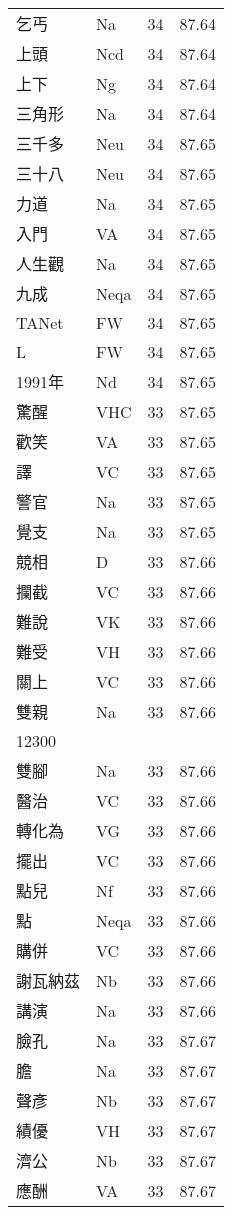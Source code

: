 \documentclass[twocolumn]{book}
\begin{document}
\begin{supertabular}{llrr}
乞丐 & Na & 34 &  87.64\\
上頭 & Ncd & 34 &  87.64\\
上下 & Ng & 34 &  87.64\\
三角形 & Na & 34 &  87.64\\
三千多 & Neu & 34 &  87.65\\
三十八 & Neu & 34 &  87.65\\
力道 & Na & 34 &  87.65\\
入門 & VA & 34 &  87.65\\
人生觀 & Na & 34 &  87.65\\
九成 & Neqa & 34 &  87.65\\
TANet & FW & 34 &  87.65\\
L & FW & 34 &  87.65\\
1991年 & Nd & 34 &  87.65\\
驚醒 & VHC & 33 &  87.65\\
歡笑 & VA & 33 &  87.65\\
譯 & VC & 33 &  87.65\\
警官 & Na & 33 &  87.65\\
覺支 & Na & 33 &  87.65\\
競相 & D & 33 &  87.66\\
攔截 & VC & 33 &  87.66\\
難說 & VK & 33 &  87.66\\
難受 & VH & 33 &  87.66\\
關上 & VC & 33 &  87.66\\
雙親 & Na & 33 &  87.66\\
12300\\
雙腳 & Na & 33 &  87.66\\
醫治 & VC & 33 &  87.66\\
轉化為 & VG & 33 &  87.66\\
擺出 & VC & 33 &  87.66\\
點兒 & Nf & 33 &  87.66\\
點 & Neqa & 33 &  87.66\\
購併 & VC & 33 &  87.66\\
謝瓦納茲 & Nb & 33 &  87.66\\
講演 & Na & 33 &  87.66\\
臉孔 & Na & 33 &  87.67\\
膽 & Na & 33 &  87.67\\
聲彥 & Nb & 33 &  87.67\\
績優 & VH & 33 &  87.67\\
濟公 & Nb & 33 &  87.67\\
應酬 & VA & 33 &  87.67\\

\end{supertabular}
\end{document}
